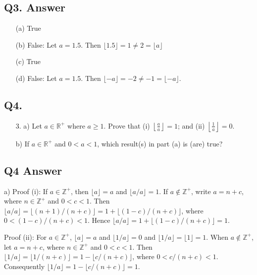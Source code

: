 \documentclass{article}
\begin{document}
\subsection*{Q3. Answer}
\begin{enumerate}
    \item[(a)] True
    \item[(b)] False: Let \( a = 1.5 \). Then \( \lfloor 1.5 \rfloor = 1 \neq 2 = \lfloor a \rfloor \)
    \item[(c)] True
    \item[(d)] False: Let \( a = 1.5 \). Then \( \lfloor -a \rfloor = -2 \neq -1 = \lfloor -a \rfloor \).
\end{enumerate}

\newpage

\subsection*{Q4.}
\begin{enumerate}
    \item[3. a)] Let \( a \in \mathbb{R}^+ \) where \( a \geq 1 \). Prove that (i) \( \left\lfloor \frac{a}{a} \right\rfloor = 1 \); and (ii) \( \left\lfloor \frac{1}{a} \right\rfloor = 0 \).
    \item[b)] If \( a \in \mathbb{R}^+ \) and \( 0 < a < 1 \), which result(s) in part (a) is (are) true?
\end{enumerate}
\newpage
\subsection*{Q4 Answer}
a) Proof (i): If \( a \in \mathbb{Z}^+ \), then \( \lfloor a \rfloor = a \) and \( \lfloor a/a \rfloor = 1 \). If \( a \notin \mathbb{Z}^+ \), write \( a = n + c \), where \( n \in \mathbb{Z}^+ \) and \( 0 < c < 1 \). Then \( \lfloor a/a \rfloor = \lfloor (n + 1)/(n + c) \rfloor = 1 + \lfloor (1 - c)/(n + c) \rfloor \), where \( 0 < (1 - c)/(n + c) < 1 \). Hence \( \lfloor a/a \rfloor = 1 + \lfloor (1 - c)/(n + c) \rfloor = 1 \).

Proof (ii): For \( a \in \mathbb{Z}^+ \), \( \lfloor a \rfloor = a \) and \( \lfloor 1/a \rfloor = 0 \) and \( \lfloor 1/a \rfloor = \lfloor 1 \rfloor = 1 \). When \( a \notin \mathbb{Z}^+ \), let \( a = n + c \), where \( n \in \mathbb{Z}^+ \) and \( 0 < c < 1 \). Then \( \lfloor 1/a \rfloor = \lfloor 1/(n + c) \rfloor = 1 - \lfloor c/(n + c) \rfloor \), where \( 0 < c/(n + c) < 1 \). Consequently \( \lfloor 1/a \rfloor = 1 - \lfloor c/(n + c) \rfloor = 1 \).
\end{document}
